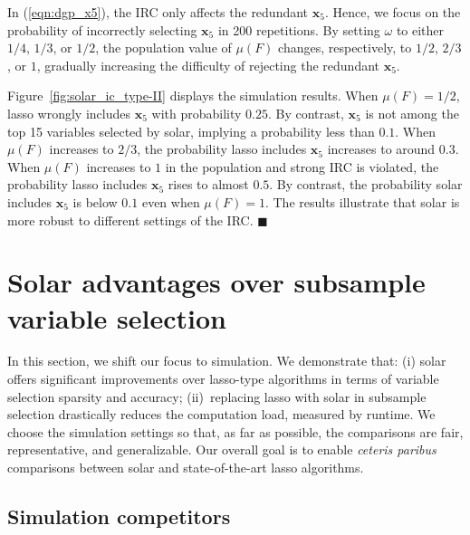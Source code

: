 \documentclass[11pt,review,authoryear]{elsarticle}
\begin{document}
In (\ref{eqn:dgp_x5}), the IRC only affects the redundant $\mathbf{x}_5$. Hence, we focus on the probability of incorrectly selecting $\mathbf{x}_5$ in 200 repetitions. By setting $\omega$ to either $1/4$, $1/3$, or $1/2$, the population value of $\mu \left( F \right)$ changes, respectively, to $1/2$, $2/3$, or $1$, gradually increasing the difficulty of rejecting the redundant $\mathbf{x}_5$.

Figure~\ref{fig:solar_ic_type-II} displays the simulation results. When $\mu \left( F \right) = 1/2$, lasso wrongly includes $\mathbf{x}_5$ with probability $0.25$. By contrast, $\mathbf{x}_5$ is not among the top 15 variables selected by solar, implying a probability less than $0.1$. When $\mu \left( F \right)$ increases to $2/3$, the probability lasso includes $\mathbf{x}_5$ increases to around $0.3$. When $\mu \left( F \right)$ increases to $1$ in the population and strong IRC is violated, the probability lasso includes $\mathbf{x}_5$ rises to almost $0.5$. By contrast, the probability solar includes $\mathbf{x}_5$ is below $0.1$ even when $\mu\left(F\right)=1$. The results illustrate that solar is more robust to different settings of the IRC. $\blacksquare$



\section{Solar advantages over subsample variable selection\label{section:comp}}

In this section, we shift our focus to simulation. We demonstrate that: (i) solar offers significant improvements over lasso-type algorithms in terms of variable selection sparsity and accuracy; (ii)~replacing lasso with solar in subsample selection drastically reduces the computation load, measured by runtime. We choose the simulation settings so that, as far as possible, the comparisons are fair, representative, and generalizable. Our overall goal is to enable \emph{ceteris paribus} comparisons between solar and state-of-the-art lasso algorithms.

\subsection{Simulation competitors}
\end{document}
